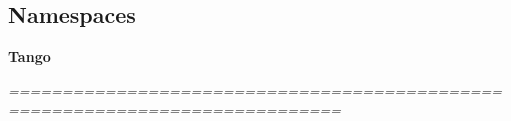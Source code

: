 \subsection*{Namespaces}
\begin{DoxyCompactItemize}
\item 
{\bf Tango}
\begin{DoxyCompactList}\small\item\em ============================================================================= \end{DoxyCompactList}\end{DoxyCompactItemize}
